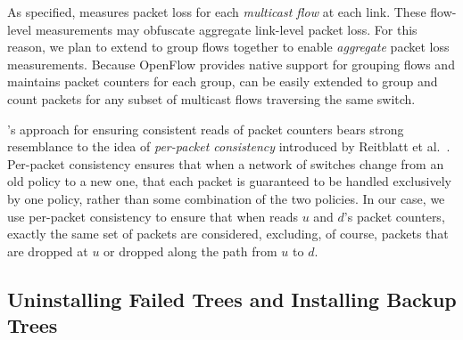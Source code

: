 As specified, \fl measures packet loss for each \emph{multicast flow} at each link.  These flow-level measurements may obfuscate aggregate link-level packet loss. For this
reason, we plan to extend \fl to group flows together to enable \emph{aggregate} packet loss measurements. 
Because OpenFlow provides native support for grouping flows and maintains packet counters for each 
group, \fl can be easily extended to group and count packets for any subset of multicast flows traversing the same switch.


\pcnts's approach for ensuring consistent reads of packet counters bears strong resemblance to the idea of \emph{per-packet consistency} introduced by Reitblatt et al.~\cite{Reitblatt11}.
Per-packet consistency ensures that when a network of switches change from an old policy to a new one, that
each packet is guaranteed to be handled exclusively by one policy, rather than some combination of the two policies.  In our case, we use per-packet consistency to ensure that when \pcnt reads
$u$ and $d$'s packet counters, exactly the same set of packets are considered, excluding, of course, packets that are dropped at $u$ or dropped along the path from $u$ to $d$. 


















\subsection{Uninstalling Failed Trees and Installing Backup Trees}
\label{subsec:uninstall-install}

